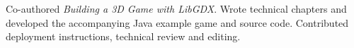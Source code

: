 Co-authored \textit{Building a 3D Game with LibGDX}. Wrote technical chapters and developed the accompanying Java example game and source code. Contributed deployment instructions, technical review and editing.
